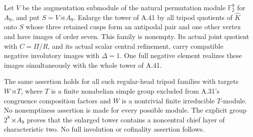Let \(V\) be the augmentation submodule of the natural
permutation module \(\mathbb F_2^9\) for \(A_9\), and put
\(S=V\rtimes A_9\). Enlarge the tower of A.41 by all
tripod quotients of \(\widehat K\) onto \(S\) whose
three retained cusps form an antipodal pair and one
other vertex and have images of order seven. This
family is nonempty. Its actual joint quotient with
\(C=\Pi/R\), and its actual scalar central refinement,
carry compatible negative involutory images with
\(\Delta=1\). One full negative element realizes these
images simultaneously with the whole tower of A.41.

The same assertion holds for all such regular-head
tripod families with targets \(W\rtimes T\), where
\(T\) is a finite nonabelian simple group excluded
from A.31's congruence composition factors and \(W\)
is a nontrivial finite irreducible \(T\)-module.
No nonemptiness assertion is made for every possible
module. The explicit group \(2^8\rtimes A_9\) proves
that the enlarged tower contains a noncentral
chief layer of characteristic two. No full
involution or cofinality assertion follows.

